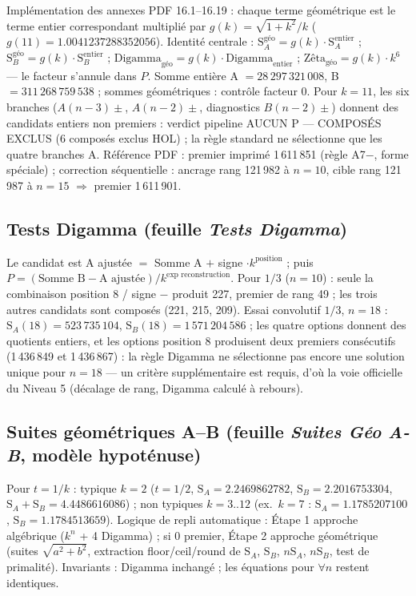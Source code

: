 \documentclass[11pt,a4paper]{article}
\newcommand{\SA}{\mathrm{S}_A}
\newcommand{\SB}{\mathrm{S}_B}
\begin{document}
Implémentation des annexes PDF 16.1--16.19 : chaque terme géométrique est le
terme entier correspondant multiplié par $g(k) = \sqrt{1+k^{2}}/k$
($g(11) = 1.0041237288352056$). Identité centrale :
$\SA^{\text{géo}} = g(k)\cdot\SA^{\text{entier}}$ ;
$\SB^{\text{géo}} = g(k)\cdot\SB^{\text{entier}}$ ;
$\text{Digamma}_{\text{géo}} = g(k)\cdot\text{Digamma}_{\text{entier}}$ ;
$\text{Zêta}_{\text{géo}} = g(k)\cdot k^{6}$ --- le facteur s'annule dans $P$.
Somme entière A $= 28\,297\,321\,008$, B $= 311\,268\,759\,538$ ; sommes
géométriques : contrôle facteur 0. Pour $k = 11$, les six branches
($A(n{-}3)\pm$, $A(n{-}2)\pm$, diagnostics $B(n{-}2)\pm$) donnent des candidats
entiers non premiers : verdict pipeline \og AUCUN P --- COMPOSÉS EXCLUS \fg{}
(6 composés exclus HOL) ; la règle standard ne sélectionne que les quatre
branches A. Référence PDF : premier imprimé 1\,611\,851 (règle A7$-$, forme
spéciale) ; correction séquentielle : ancrage rang 121\,982 à $n=10$, cible
rang 121\,987 à $n=15$ $\Rightarrow$ premier 1\,611\,901.

\subsection{Tests Digamma (feuille \emph{Tests Digamma})}

Le candidat est A ajustée $=$ Somme A $+$ signe $\cdot k^{\text{position}}$ ;
puis $P = (\text{Somme B} - \text{A ajustée})/k^{\text{exp reconstruction}}$.
Pour $1/3$ ($n=10$) : seule la combinaison position 8 / signe $-$ produit 227,
premier de rang 49 ; les trois autres candidats sont composés (221, 215, 209).
Essai convolutif $1/3$, $n = 18$ : $\SA(18) = 523\,735\,104$,
$\SB(18) = 1\,571\,204\,586$ ; les quatre options donnent des quotients
entiers, et les options position 8 produisent deux premiers consécutifs
(1\,436\,849 et 1\,436\,867) : la règle Digamma ne sélectionne pas encore une
solution unique pour $n = 18$ --- un critère supplémentaire est requis, d'où la
voie officielle du Niveau 5 (décalage de rang, Digamma calculé à rebours).

\subsection{Suites géométriques A--B (feuille \emph{Suites Géo A-B}, modèle hypoténuse)}

Pour $t = 1/k$ : typique $k=2$ ($t = 1/2$, $\SA = 2.2469862782$,
$\SB = 2.2016753304$, $\SA + \SB = 4.4486616086$) ; non typiques $k = 3..12$
(ex.\ $k=7$ : $\SA = 1.1785207100$, $\SB = 1.1784513659$). Logique de repli
automatique : Étape 1 approche algébrique ($k^{n}$ + 4 Digamma) ; si 0 premier,
Étape 2 approche géométrique (suites $\sqrt{a^{2}+b^{2}}$, extraction
floor/ceil/round de $\SA$, $\SB$, $n\SA$, $n\SB$, test de primalité).
Invariants : Digamma inchangé ; les équations pour $\forall n$ restent
identiques.
\end{document}
